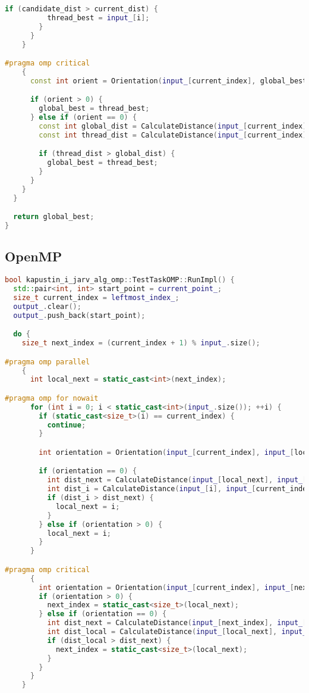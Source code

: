 \documentclass[a4paper,12pt]{article}
\begin{document}
\begin{itemize}
\begin{lstlisting}[language=C++]
        if (candidate_dist > current_dist) {
          thread_best = input_[i];
        }
      }
    }

#pragma omp critical
    {
      const int orient = Orientation(input_[current_index], global_best, thread_best);

      if (orient > 0) {
        global_best = thread_best;
      } else if (orient == 0) {
        const int global_dist = CalculateDistance(input_[current_index], global_best);
        const int thread_dist = CalculateDistance(input_[current_index], thread_best);

        if (thread_dist > global_dist) {
          global_best = thread_best;
        }
      }
    }
  }

  return global_best;
}
\end{lstlisting}

\subsection*{OpenMP}
\begin{lstlisting}[language=C++]
bool kapustin_i_jarv_alg_omp::TestTaskOMP::RunImpl() {
  std::pair<int, int> start_point = current_point_;
  size_t current_index = leftmost_index_;
  output_.clear();
  output_.push_back(start_point);

  do {
    size_t next_index = (current_index + 1) % input_.size();

#pragma omp parallel
    {
      int local_next = static_cast<int>(next_index);

#pragma omp for nowait
      for (int i = 0; i < static_cast<int>(input_.size()); ++i) {
        if (static_cast<size_t>(i) == current_index) {
          continue;
        }

        int orientation = Orientation(input_[current_index], input_[local_next], input_[i]);

        if (orientation == 0) {
          int dist_next = CalculateDistance(input_[local_next], input_[current_index]);
          int dist_i = CalculateDistance(input_[i], input_[current_index]);
          if (dist_i > dist_next) {
            local_next = i;
          }
        } else if (orientation > 0) {
          local_next = i;
        }
      }

#pragma omp critical
      {
        int orientation = Orientation(input_[current_index], input_[next_index], input_[local_next]);
        if (orientation > 0) {
          next_index = static_cast<size_t>(local_next);
        } else if (orientation == 0) {
          int dist_next = CalculateDistance(input_[next_index], input_[current_index]);
          int dist_local = CalculateDistance(input_[local_next], input_[current_index]);
          if (dist_local > dist_next) {
            next_index = static_cast<size_t>(local_next);
          }
        }
      }
    }


\end{lstlisting}
\end{itemize}
\end{document}
